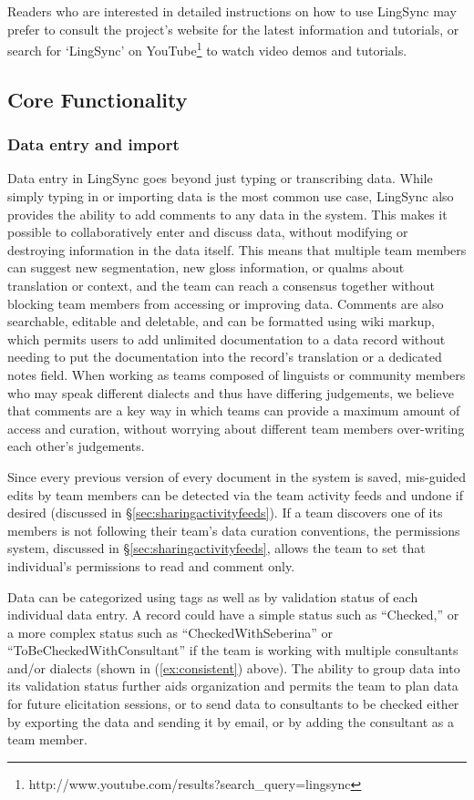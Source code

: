 \documentclass[letterpaper, 12pt, dvips]{mitwpl}
\begin{document}
Readers who are interested in detailed instructions on how to use LingSync may prefer to consult the project's website \citep{LingSync:2013}  for the latest information and tutorials, or search for `LingSync' on YouTube\footnote{http://www.youtube.com/results?search\_query=lingsync} to watch video demos and tutorials.

\subsection{Core Functionality}
\label{sec:core}
\subsubsection{Data entry and import}


Data entry in LingSync goes beyond just typing or transcribing data.
While simply typing in or importing data is the most common use case,
LingSync also provides the ability to add comments to any data in the system.
This makes it possible to collaboratively enter and discuss data,
without modifying or destroying information in the data itself.
This means that multiple team members can suggest new segmentation,
new gloss information,
or qualms about translation or context,
and the team can reach a consensus together without blocking team members from accessing or improving data.
Comments are also searchable, editable and deletable,
and can be formatted using wiki markup, which permits users to add unlimited documentation to a data record without needing to put the documentation into the record's  translation or a dedicated notes field.
When working as teams composed of linguists or community members who may speak different dialects
and thus have differing judgements,
we believe that comments are a key way in which teams can provide a maximum amount of access and curation,
without worrying about different team members over-writing each other's judgements.


Since every previous version of every document in the system is saved,
mis-guided edits by team members can be detected  via the team activity feeds and undone if desired (discussed in \S \ref{sec:sharingactivityfeeds}).
If a team discovers one of its members is not following their team's data curation conventions,
the permissions system, discussed in \S \ref{sec:sharingactivityfeeds}, allows the team to set that individual's permissions to read and comment only.
 

Data can be categorized using tags as well as by validation status of each individual data entry.
A record could have a simple status such as ``Checked,'' or a more complex status such as  ``CheckedWithSeberina'' or ``ToBeCheckedWithConsultant'' if the team is working with multiple consultants and/or dialects (shown in (\ref{ex:consistent}) above).
The ability to group data into its validation status further aids organization and permits the team to plan data for future elicitation sessions,
or to send data to consultants to be checked either by exporting the data and sending it by email,
or by adding the consultant as a team member. 
\end{document}
